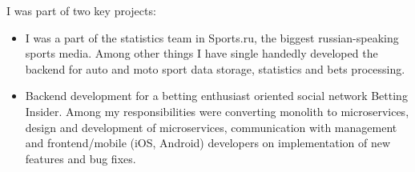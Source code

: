 I was part of two key projects:

\begin{itemize}
    \item I was a part of the statistics team in Sports.ru, the biggest russian-speaking sports media. Among other things I have single handedly developed the backend for auto and moto sport data storage, statistics and bets processing.
    \item Backend development for a betting enthusiast oriented social network Betting Insider. Among my responsibilities were converting monolith to microservices, design and development of microservices, communication with management and frontend/mobile (iOS, Android) developers on implementation of new features and bug fixes.
\end{itemize}
